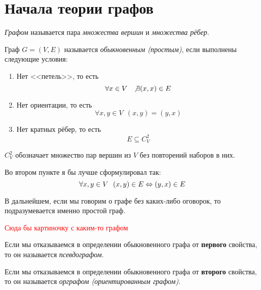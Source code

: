 \section{Начала теории графов}

\begin{definition}
	\textit{Графом} называется пара \textit{множества вершин} и \textit{множества рёбер}.
\end{definition}

\begin{definition}
	Граф $G = (V, E)$ называется \textit{обыкновенным (простым)}, если выполнены следующие условия:
	\begin{enumerate}
		\item Нет <<петель>>, то есть
		\[
			\forall x \in V\ \ \not\exists (x, x) \in E
		\]
		
		\item Нет ориентации, то есть
		\[
			\forall x, y \in V\ \ (x, y) = (y, x)
		\]
		
		\item Нет кратных рёбер, то есть
		\[
			E \subseteq C_V^2
		\]
	\end{enumerate}
\end{definition}

\begin{note}
	$C_V^2$ обозначает множество пар вершин из $V$ без повторений наборов в них.
\end{note}

\begin{anote}
	Во втором пункте я бы лучше сформулировал так:
	\[
		\forall x, y \in V\ \ (x, y) \in E \Leftrightarrow (y, x) \in E
	\]
\end{anote}

\begin{note}
	В дальнейшем, если мы говорим о графе без каких-либо оговорок, то подразумевается именно простой граф.
\end{note}

\textcolor{red}{Сюда бы картиночку с каким-то графом}

\begin{definition}
	Если мы отказываемся в определении обыкновенного графа от \textbf{первого} свойства, то он называется \textit{псевдографом}.
\end{definition}

\begin{definition}
	Если мы отказываемся в определении обыкновенного графа от \textbf{второго} свойства, то он называется \textit{орграфом (ориентированным графом)}.
\end{definition}

